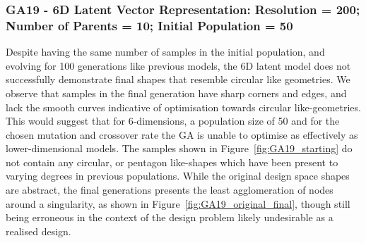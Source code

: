 \documentclass{article}
\begin{document}
\subsubsection*{GA19 - 6D Latent Vector Representation: Resolution = 200; Number of Parents = 10; Initial Population = 50}

Despite having the same number of samples in the initial population, and evolving for 100 generations like previous models, the 6D latent model does not successfully demonstrate final shapes that resemble circular like geometries. We observe that samples in the final generation have sharp corners and edges, and lack the smooth curves indicative of optimisation towards circular like-geometries. This would suggest that for 6-dimensions, a population size of 50 and for the chosen mutation and crossover rate the GA is unable to optimise as effectively as lower-dimensional models. The samples shown in Figure~\ref{fig:GA19_starting} do not contain any circular, or pentagon like-shapes which have been present to varying degrees in previous populations. While the original design space shapes are abstract, the final generations presents the least agglomeration of nodes around a singularity, as shown in Figure~\ref{fig:GA19_original_final}, though still being erroneous in the context of the design problem likely undesirable as a realised design.
\end{document}
